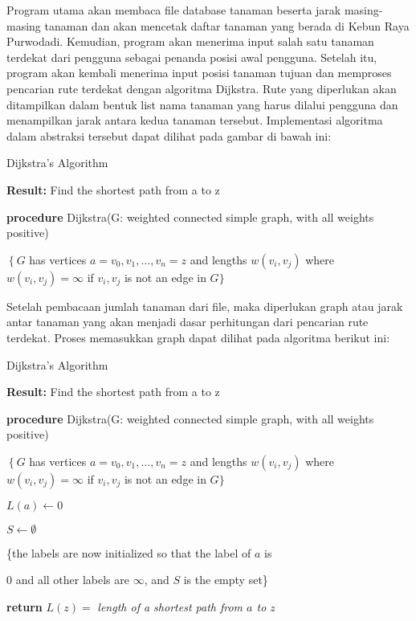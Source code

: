 \documentclass[10pt, conference]{IEEEtran}
\begin{document}
Program utama akan membaca file database tanaman beserta jarak masing-masing tanaman dan akan mencetak daftar tanaman yang berada di Kebun Raya Purwodadi. Kemudian, program akan menerima input salah satu tanaman terdekat dari pengguna sebagai penanda posisi awal pengguna. Setelah itu, program akan kembali menerima input posisi tanaman tujuan dan memproses pencarian rute terdekat dengan algoritma Dijkstra. Rute yang diperlukan akan ditampilkan dalam bentuk list nama tanaman yang harus dilalui pengguna dan menampilkan jarak antara kedua tanaman tersebut. Implementasi algoritma dalam abstraksi tersebut dapat dilihat pada gambar di bawah ini: 

\begin{algorithm}

\caption{Dijkstra’s Algorithm}
\label{alg:two}

\textbf{Result:} Find the shortest path from a to $\mathrm{z}$

\textbf{procedure} Dijkstra(G: weighted connected simple graph, with all weights positive)

$\left\{G\right.$ has vertices $a=v_{0}, v_{1}, \ldots, v_{n}=z$ and lengths $w\left(v_{i}, v_{j}\right)$ where $w\left(v_{i}, v_{j}\right)=\infty$ if $v_{i}, v_{j}$ is not an edge in $G\}$

\end{algorithm}

Setelah pembacaan jumlah tanaman dari file, maka diperlukan graph atau jarak antar tanaman yang akan menjadi dasar perhitungan dari pencarian rute terdekat. Proses memasukkan graph dapat dilihat pada algoritma berikut ini: 

\begin{algorithm}

\caption{Dijkstra’s Algorithm}
\label{alg:two}

\textbf{Result:} Find the shortest path from a to $\mathrm{z}$

\textbf{procedure} Dijkstra(G: weighted connected simple graph, with all weights positive)

$\left\{G\right.$ has vertices $a=v_{0}, v_{1}, \ldots, v_{n}=z$ and lengths $w\left(v_{i}, v_{j}\right)$ where $w\left(v_{i}, v_{j}\right)=\infty$ if $v_{i}, v_{j}$ is not an edge in $G\}$


$L(a)\gets0$

$S\gets\emptyset$

\{the labels are now initialized so that the label of $a$ is

0 and all other labels are $\infty$, and $S$ is the empty set\}

\textbf{return} $L(z) =$ \emph{length of a shortest path from $a$ to $z$}
\end{algorithm}
\end{document}
